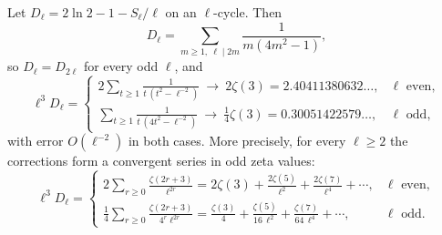 \documentclass[11pt]{article}
\theoremstyle{remark}\newtheorem{remark}[theorem]{Remark}
\begin{document}
\begin{proposition}\label{prop:zeta3}
Let $D_\ell=2\ln2-1-S_\ell/\ell$ on an $\ell$-cycle. Then
\[
D_\ell=\sum_{m\ge1,\ \ell\mid 2m}\frac{1}{m(4m^2-1)},
\]
so $D_\ell=D_{2\ell}$ for every odd $\ell$, and
\[
\ell^3D_\ell=\begin{cases}\displaystyle 2\sum_{t\ge1}\frac{1}{t\,(t^2-\ell^{-2})}\ \longrightarrow\ 2\zeta(3)=2.40411380632\ldots,&\ell\text{ even},\\[12pt] \displaystyle\sum_{t\ge1}\frac{1}{t\,(4t^2-\ell^{-2})}\ \longrightarrow\ \tfrac14\zeta(3)=0.30051422579\ldots,&\ell\text{ odd},\end{cases}
\]
with error $O(\ell^{-2})$ in both cases. More precisely, for every $\ell\ge2$ the corrections form a convergent series in odd zeta values:
\[
\ell^3D_\ell=\begin{cases}\displaystyle 2\sum_{r\ge0}\frac{\zeta(2r+3)}{\ell^{2r}}=2\zeta(3)+\frac{2\zeta(5)}{\ell^2}+\frac{2\zeta(7)}{\ell^4}+\cdots,&\ell\text{ even},\\[14pt] \displaystyle \frac14\sum_{r\ge0}\frac{\zeta(2r+3)}{4^r\ell^{2r}}=\frac{\zeta(3)}4+\frac{\zeta(5)}{16\,\ell^2}+\frac{\zeta(7)}{64\,\ell^4}+\cdots,&\ell\text{ odd}.\end{cases}
\]
\end{proposition}
\end{document}
